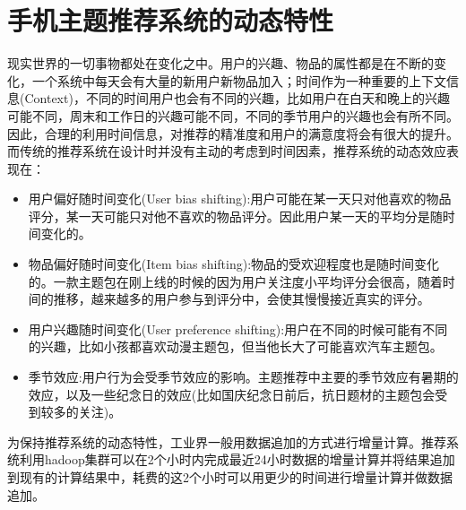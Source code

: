 	\section{手机主题推荐系统的动态特性}
		现实世界的一切事物都处在变化之中。用户的兴趣、物品的属性都是在不断的变化，一个系统中每天会有大量的新用户新物品加入；时间作为一种重要的上下文信息(Context)，不同的时间用户也会有不同的兴趣，比如用户在白天和晚上的兴趣可能不同，周末和工作日的兴趣可能不同，不同的季节用户的兴趣也会有所不同。因此，合理的利用时间信息，对推荐的精准度和用户的满意度将会有很大的提升。而传统的推荐系统在设计时并没有主动的考虑到时间因素，推荐系统的动态效应表现在：
		\begin{itemize}
		\item 用户偏好随时间变化(User bias shifting):用户可能在某一天只对他喜欢的物品评分，某一天可能只对他不喜欢的物品评分。因此用户某一天的平均分是随时间变化的。
		\item 物品偏好随时间变化(Item bias shifting):物品的受欢迎程度也是随时间变化的。一款主题包在刚上线的时候的因为用户关注度小平均评分会很高，随着时间的推移，越来越多的用户参与到评分中，会使其慢慢接近真实的评分。
		\item 用户兴趣随时间变化(User preference shifting):用户在不同的时候可能有不同的兴趣，比如小孩都喜欢动漫主题包，但当他长大了可能喜欢汽车主题包。
		\item 季节效应:用户行为会受季节效应的影响。主题推荐中主要的季节效应有暑期的效应，以及一些纪念日的效应(比如国庆纪念日前后，抗日题材的主题包会受到较多的关注)。
		\end{itemize}

		为保持推荐系统的动态特性，工业界一般用数据追加的方式进行增量计算。推荐系统利用hadoop集群可以在2个小时内完成最近24小时数据的增量计算并将结果追加到现有的计算结果中，耗费的这2个小时可以用更少的时间进行增量计算并做数据追加。

